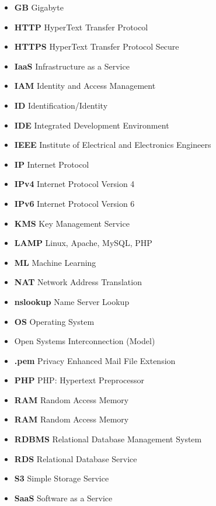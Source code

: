 \begin{itemize}
    \item  \textbf{GB} \textemdash Gigabyte
    \item  \textbf{HTTP} \textemdash HyperText Transfer Protocol
    \item  \textbf{HTTPS} \textemdash HyperText Transfer Protocol Secure
    \item  \textbf{IaaS} \textemdash Infrastructure as a Service
    \item  \textbf{IAM} \textemdash Identity and Access Management
    \item  \textbf{ID} \textemdash Identification/Identity
    \item  \textbf{IDE} \textemdash Integrated Development Environment
    \item  \textbf{IEEE} \textemdash Institute of Electrical and Electronics Engineers
    \item  \textbf{IP} \textemdash Internet Protocol
    \item  \textbf{IPv4} \textemdash Internet Protocol Version 4
    \item  \textbf{IPv6} \textemdash Internet Protocol Version 6
    \item  \textbf{KMS} \textemdash Key Management Service
    \item  \textbf{LAMP} \textemdash Linux, Apache, MySQL, PHP
    \item  \textbf{ML} \textemdash Machine Learning
    \item  \textbf{NAT} \textemdash Network Address Translation
    \item  \textbf{nslookup} \textemdash Name Server Lookup
    \item  \textbf{OS} \textemdash Operating System
    \item  {} \textemdash Open Systems Interconnection (Model)
    \item  \textbf{.pem} \textemdash Privacy Enhanced Mail File Extension
    \item  \textbf{PHP} \textemdash PHP: Hypertext Preprocessor
    \item  \textbf{RAM} \textemdash Random Access Memory
    \item  \textbf{RAM} \textemdash Random Access Memory
    \item  \textbf{RDBMS} \textemdash Relational Database Management System
    \item  \textbf{RDS} \textemdash Relational Database Service
    \item  \textbf{S3} \textemdash Simple Storage Service
    \item  \textbf{SaaS} \textemdash Software as a Service

\end{itemize}
